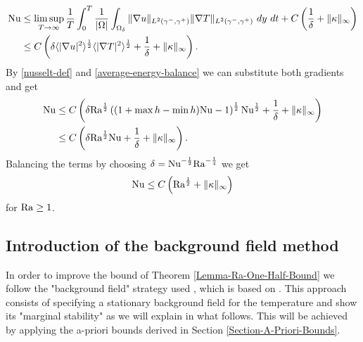 \documentclass{article}
\theoremstyle{definition}
\theoremstyle{definition}
\newcommand{\Ra}{{\rm{Ra}}}
\newcommand{\Nu}{{\rm{Nu}}}
\begin{document}
\begin{align*}
    \Nu &\leq
    \limsup_{T\to\infty} \frac{1}{T}\int_0^T \frac{1}{|\Omega|} \int_{\Omega_\delta} \|\nabla u\|_{L^2(\gamma^-,\gamma^+)}\|\nabla T\|_{L^2(\gamma^-,\gamma^+)} \ dy\ dt + C\left(\frac{1}{\delta}+\|\kappa\|_\infty\right)
    \\
    &\leq C \left(\delta \langle |\nabla u|^2 \rangle^\frac{1}{2} \langle |\nabla T|^2 \rangle^\frac{1}{2}+\frac{1}{\delta}+\|\kappa\|_\infty\right).
\end{align*}
By \eqref{nusselt-def} and \eqref{average-energy-balance} we can substitute both gradients and get
\begin{align*}
    \Nu &\leq C \left(\delta\Ra^\frac{1}{2}\left((1+\max h-\min h) \Nu-1\right)^\frac{1}{2} \Nu^\frac{1}{2}+\frac{1}{\delta}+\|\kappa\|_\infty\right) 
    \\
    &\leq  C\left(\delta\Ra^\frac{1}{2} \Nu+\frac{1}{\delta}+\|\kappa\|_\infty\right).
\end{align*}
Balancing the terms by choosing $\delta=\Nu^{-\frac{1}{2}}\Ra^{-\frac{1}{4}}$ we get
\begin{align*}
    \Nu \leq  C\left(\Ra^\frac{1}{2}+\|\kappa\|_\infty\right)
\end{align*}
for $\Ra \geq 1$.


\subsection{Introduction of the background field method}
\leavevmode


In order to improve the bound of Theorem \ref{Lemma-Ra-One-Half-Bound} we follow the "background field" strategy used \cite{drivasNguyenNobiliBoundsOnHeatFluxForRayleighBenardConvectionBetweenNavierSlipFixedTemperatureBoundaries}, which is based on \cite{whiteheadDoeringUltimateState}. This approach consists of specifying a stationary background field for the temperature and show its "marginal stability" as we will explain in what follows. This will be achieved by applying the a-priori bounds derived in Section \ref{Section-A-Priori-Bounds}.
\end{document}
